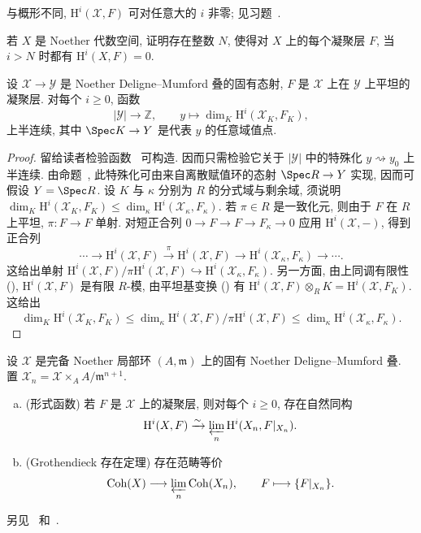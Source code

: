 \begin{remark}\label{src:5.6.9}
与概形不同, $\mathrm H^i(\mathcal X,F)$ 可对任意大的 $i$ 非零; 见习题~.
\end{remark}
\begin{exercise}\label{src:5.6.10}
若 $X$ 是 Noether 代数空间, 证明存在整数 $N$, 使得对 $X$ 上的每个凝聚层 $F$, 当 $i>N$ 时都有 $\mathrm H^i(X,F)=0$.
\end{exercise}
\begin{proposition}[半连续性]\label{src:5.6.11}
设 $\mathcal X\to\mathcal Y$ 是 Noether Deligne--Mumford 叠的固有态射, $F$ 是 $\mathcal X$ 上在 $\mathcal Y$ 上平坦的凝聚层. 对每个 $i\geq0$, 函数
\begin{equation}\label{src:5.6.12}
|\mathcal Y|\longrightarrow\mathbb Z,\qquad y\longmapsto\dim_K\mathrm H^i(\mathcal X_K,F_K),
\end{equation}
上半连续, 其中 $\Spec K\to\mathcal Y$ 是代表 $y$ 的任意域值点.
\end{proposition}
\begin{proof}
留给读者检验函数~ 可构造. 因而只需检验它关于 $|\mathcal Y|$ 中的特殊化 $y\rightsquigarrow y_0$ 上半连续. 由命题~, 此特殊化可由来自离散赋值环的态射 $\Spec R\to\mathcal Y$ 实现, 因而可假设 $\mathcal Y=\Spec R$. 设 $K$ 与 $\kappa$ 分别为 $R$ 的分式域与剩余域, 须说明 $\dim_K\mathrm H^i(\mathcal X_K,F_K)\leq\dim_\kappa\mathrm H^i(\mathcal X_\kappa,F_\kappa)$. 若 $\pi\in R$ 是一致化元, 则由于 $F$ 在 $R$ 上平坦, $\pi:F\to F$ 单射. 对短正合列 $0\to F\to F\to F_\kappa\to0$ 应用 $\mathrm H^i(\mathcal X,-)$, 得到正合列
\[
\cdots\longrightarrow\mathrm H^i(\mathcal X,F)\xrightarrow{\pi}\mathrm H^i(\mathcal X,F)\longrightarrow\mathrm H^i(\mathcal X_\kappa,F_\kappa)\longrightarrow\cdots.
\]
这给出单射 $\mathrm H^i(\mathcal X,F)/\pi\mathrm H^i(\mathcal X,F)\hookrightarrow\mathrm H^i(\mathcal X_\kappa,F_\kappa)$. 另一方面, 由上同调有限性 (), $\mathrm H^i(\mathcal X,F)$ 是有限 $R$-模, 由平坦基变换 () 有 $\mathrm H^i(\mathcal X,F)\otimes_R K=\mathrm H^i(\mathcal X,F_K)$. 这给出
\[
\dim_K\mathrm H^i(\mathcal X_K,F_K)\leq\dim_\kappa\mathrm H^i(\mathcal X,F)/\pi\mathrm H^i(\mathcal X,F)\leq\dim_\kappa\mathrm H^i(\mathcal X_\kappa,F_\kappa).
\]
\end{proof}
\begin{exercise}[困难]\label{src:5.6.13}
设 $\mathcal X$ 是完备 Noether 局部环 $(A,\mathfrak m)$ 上的固有 Noether Deligne--Mumford 叠. 置 $\mathcal X_n=\mathcal X\times_A A/\mathfrak m^{n+1}$.
\begin{enumerate}[(a)]
\item (形式函数) 若 $F$ 是 $\mathcal X$ 上的凝聚层, 则对每个 $i\geq0$, 存在自然同构
\[
\mathrm H^i(\mathcal X,F)\xrightarrow{\sim}\varprojlim_n\mathrm H^i(\mathcal X_n,F|_{\mathcal X_n}).
\]
\item (Grothendieck 存在定理) 存在范畴等价
\[
\operatorname{Coh}(\mathcal X)\longrightarrow\varprojlim_n\operatorname{Coh}(\mathcal X_n),\qquad F\longmapsto\{F|_{\mathcal X_n}\}.
\]
\end{enumerate}
另见~\cite[定理 $1.4$]{Ols05} 和~\cite[推论 $3.2$, 定理 $4.1$]{Con05a}.
\end{exercise}
